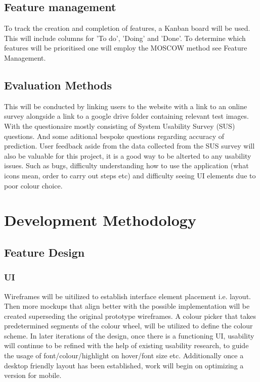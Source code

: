   \subsection{Feature management}
    To track the creation and completion of features, a Kanban board will be used. This will include columns for 'To do', 'Doing' and 'Done'.
    To determine which features will be prioritised one will employ the MOSCOW method see Feature Management.


  \subsection{Evaluation Methods}
    This will be conducted by linking users to the website with a link to an online survey alongside a link to a google drive folder containing relevant test images. With the questionaire mostly consisting of System Usability Survey (SUS) questions. And some aditional bespoke questions regarding accuracy of prediction. User feedback aside from the data collected from the SUS survey will also be valuable for this project, it is a good way to be alterted to any usability issues. Such as bugs, difficulty understanding how to use the application (what icons mean, order to carry out steps etc) and difficulty seeing UI elements due to poor colour choice.

\section{Development Methodology}
  \subsection{Feature Design}
    \subsubsection{UI}
      Wireframes will be uitilized to establish interface element placement i.e. layout. Then more mockups that align better with the possible implementation will be created superseding the original prototype wireframes. A colour picker that takes predetermined segments of the colour wheel, will be utilized to define the colour scheme. In later iterations of the design, once there is a functioning UI, usability will continue to be refined with the help of existing usability research, to guide the usage of font/colour/highlight on hover/font size etc. Additionally once a desktop friendly layout has been established, work will begin on optimizing a version for mobile.
